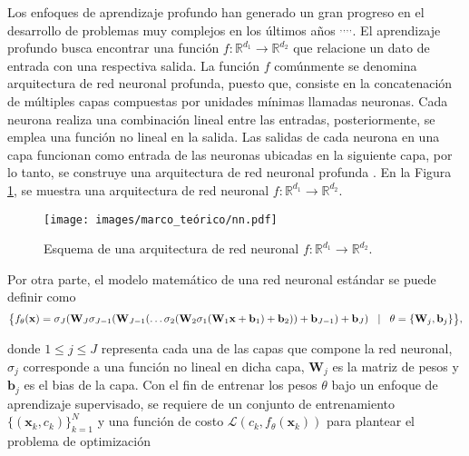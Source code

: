 Los enfoques de aprendizaje profundo han generado un gran progreso en el desarrollo de problemas muy complejos en los últimos años
$^,$$^,$$^,$$^,$. El aprendizaje profundo busca encontrar una función $f: \mathbb{R}^{d_1} \rightarrow \mathbb{R}^{d_2}$ que relacione un dato de entrada con una respectiva salida. La función $f$ comúnmente se denomina arquitectura de red neuronal profunda, puesto que, consiste en la concatenación de múltiples capas compuestas por unidades mínimas llamadas neuronas. Cada neurona realiza una combinación lineal entre las entradas, posteriormente, se emplea una función no lineal en la salida. Las salidas de cada neurona en una capa funcionan como entrada de las neuronas ubicadas en la siguiente capa, por lo tanto, se construye una arquitectura de red neuronal profunda . En la Figura \ref{fig:nn}, se muestra una arquitectura de red neuronal $f: \mathbb{R}^{d_1} \rightarrow \mathbb{R}^{d_2}$.

\begin{figure}[H]
    \centering
    \caption{\hspace{2mm}Esquema de una arquitectura de red neuronal $f: \mathbb{R}^{d_1} \rightarrow \mathbb{R}^{d_2}$.}
    \texttt{[image: images/marco\_teórico/nn.pdf]}
    \label{fig:nn}
\end{figure}

Por otra parte, el modelo matemático de una red neuronal estándar se puede definir como
\begin{equation}
    \footnotesize 
    \big\{f_\theta(\mathbf{x}) = \sigma_{J}(\mathbf{W}_{J}\sigma_{J-1}(\mathbf{W}_{J-1} (\dots \sigma_2(\mathbf{W}_2\sigma_1(\mathbf{W}_1\mathbf{x} + \mathbf{b}_1) + \mathbf{b}_2))  + \mathbf{b}_{J-1})  + \mathbf{b}_J) \quad \vert \quad\theta = \{\mathbf{W}_{j}, \mathbf{b}_{j}\}  \big\},
    \label{eq:red_neuronal}
\end{equation}

donde $1 \leq j \leq J$ representa cada una de las capas que compone la red neuronal, $\sigma_j$ corresponde a una función no lineal en dicha capa, $\mathbf{W}_j$ es la matriz de pesos y $\mathbf{b}_j$ es el bias de la capa. Con el fin de entrenar los pesos $\theta$ bajo un enfoque de aprendizaje supervisado, se requiere de un conjunto de entrenamiento $\{(\mathbf{x}_k, c_k) \}_{k=1}^{N}$ y una función de costo $\mathcal{L}( c_k,  f_\theta(\mathbf{x}_k))$ para plantear el problema de optimización 

